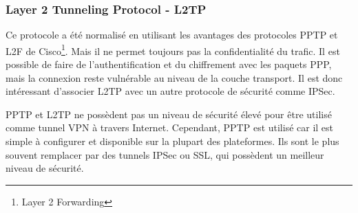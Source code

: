 \subsubsection{Layer 2 Tunneling Protocol - L2TP}
Ce protocole a été normalisé en utilisant les avantages des protocoles PPTP et L2F de Cisco\footnote{Layer 2 Forwarding}. 
Mais il ne permet toujours pas la confidentialité du trafic. 
Il est possible de faire de l'authentification et du chiffrement avec les paquets PPP, mais la connexion reste vulnérable au niveau de la couche transport. 
Il est donc intéressant d'associer L2TP avec un autre protocole de sécurité comme IPSec.

PPTP  et L2TP ne possèdent pas un niveau de sécurité élevé pour être utilisé comme tunnel VPN à travers Internet.
Cependant, PPTP est utilisé car il est simple à configurer et disponible sur la plupart des plateformes.
Ils sont le plus souvent remplacer par des tunnels IPSec ou SSL, qui possèdent un meilleur niveau de sécurité.